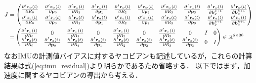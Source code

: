 \begin{align}
  \begin{split}
  J
  & = 
  \left( \begin{matrix}
    \frac{ \partial {}^{I}{\bf r}_{\omega}(t) }{ \partial R_{0} } &
    \frac{ \partial {}^{I}{\bf r}_{\omega}(t) }{ \partial {\bf p}_{0} } &
    \frac{ \partial {}^{I}{\bf r}_{\omega}(t) }{ \partial R_{1} } &
    \frac{ \partial {}^{I}{\bf r}_{\omega}(t) }{ \partial {\bf p}_{1} } &
    \frac{ \partial {}^{I}{\bf r}_{\omega}(t) }{ \partial R_{2} } &
    \frac{ \partial {}^{I}{\bf r}_{\omega}(t) }{ \partial {\bf p}_{2} } &
    \frac{ \partial {}^{I}{\bf r}_{\omega}(t) }{ \partial R_{3} } &
    \frac{ \partial {}^{I}{\bf r}_{\omega}(t) }{ \partial {\bf p}_{3} } &
    \frac{ \partial {}^{I}{\bf r}_{\omega}(t) }{ \partial {\bf b}_{g}^{k+1} } &
    \frac{ \partial {}^{I}{\bf r}_{\omega}(t) }{ \partial {\bf b}_{a}^{k+1} } \\
    \frac{ \partial {}^{I}{\bf r}_{a}(t) }{ \partial R_{0} } &
    \frac{ \partial {}^{I}{\bf r}_{a}(t) }{ \partial {\bf p}_{0} } &
    \frac{ \partial {}^{I}{\bf r}_{a}(t) }{ \partial R_{1} } &
    \frac{ \partial {}^{I}{\bf r}_{a}(t) }{ \partial {\bf p}_{1} } &
    \frac{ \partial {}^{I}{\bf r}_{a}(t) }{ \partial R_{2} } &
    \frac{ \partial {}^{I}{\bf r}_{a}(t) }{ \partial {\bf p}_{2} } &
    \frac{ \partial {}^{I}{\bf r}_{a}(t) }{ \partial R_{3} } &
    \frac{ \partial {}^{I}{\bf r}_{a}(t) }{ \partial {\bf p}_{3} } &
    \frac{ \partial {}^{I}{\bf r}_{a}(t) }{ \partial {\bf b}_{g}^{k+1} } &
    \frac{ \partial {}^{I}{\bf r}_{a}(t) }{ \partial {\bf b}_{a}^{k+1} } \\
  \end{matrix} \right) \\
  & = 
  \left( \begin{matrix}
    \frac{ \partial {}^{I}{\bf r}_{\omega}(t) }{ \partial R_{0} } &
    0 &
    \frac{ \partial {}^{I}{\bf r}_{\omega}(t) }{ \partial R_{1} } &
    0 &
    \frac{ \partial {}^{I}{\bf r}_{\omega}(t) }{ \partial R_{2} } &
    0 &
    \frac{ \partial {}^{I}{\bf r}_{\omega}(t) }{ \partial R_{3} } &
    0 &
    I &
    0 \\
    \frac{ \partial {}^{I}{\bf r}_{a}(t) }{ \partial R_{0} } &
    \frac{ \partial {}^{I}{\bf r}_{a}(t) }{ \partial {\bf p}_{0} } &
    \frac{ \partial {}^{I}{\bf r}_{a}(t) }{ \partial R_{1} } &
    \frac{ \partial {}^{I}{\bf r}_{a}(t) }{ \partial {\bf p}_{1} } &
    \frac{ \partial {}^{I}{\bf r}_{a}(t) }{ \partial R_{2} } &
    \frac{ \partial {}^{I}{\bf r}_{a}(t) }{ \partial {\bf p}_{2} } &
    \frac{ \partial {}^{I}{\bf r}_{a}(t) }{ \partial R_{3} } &
    \frac{ \partial {}^{I}{\bf r}_{a}(t) }{ \partial {\bf p}_{3} } &
    0 &
    I \\
  \end{matrix} \right) \in \mathbb{R}^{6 \times 30}
  \end{split}
\end{align}
%
なおIMUの計測値バイアスに対するヤコビアンも記述しているが，これらの計算結果は式(\ref{eq:imu_residual})より明らかであるため省略する．
以下ではまず，加速度に関するヤコビアンの導出から考える．






